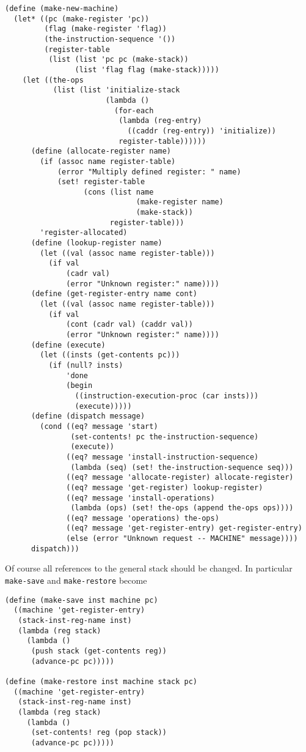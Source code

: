 \documentclass[a4paper,12pt]{article}
\begin{document}
\begin{lstlisting}
(define (make-new-machine)
  (let* ((pc (make-register 'pc))
         (flag (make-register 'flag))
         (the-instruction-sequence '())
         (register-table
          (list (list 'pc pc (make-stack))
                (list 'flag flag (make-stack)))))
    (let ((the-ops
           (list (list 'initialize-stack
                       (lambda ()
                         (for-each
                          (lambda (reg-entry)
                            ((caddr (reg-entry)) 'initialize))
                          register-table))))))
      (define (allocate-register name)
        (if (assoc name register-table)
            (error "Multiply defined register: " name)
            (set! register-table
                  (cons (list name
                              (make-register name)
                              (make-stack))
                        register-table)))
        'register-allocated)
      (define (lookup-register name)
        (let ((val (assoc name register-table)))
          (if val
              (cadr val)
              (error "Unknown register:" name))))
      (define (get-register-entry name cont)
        (let ((val (assoc name register-table)))
          (if val
              (cont (cadr val) (caddr val))
              (error "Unknown register:" name))))
      (define (execute)
        (let ((insts (get-contents pc)))
          (if (null? insts)
              'done
              (begin
                ((instruction-execution-proc (car insts)))
                (execute)))))
      (define (dispatch message)
        (cond ((eq? message 'start)
               (set-contents! pc the-instruction-sequence)
               (execute))
              ((eq? message 'install-instruction-sequence)
               (lambda (seq) (set! the-instruction-sequence seq)))
              ((eq? message 'allocate-register) allocate-register)
              ((eq? message 'get-register) lookup-register)
              ((eq? message 'install-operations)
               (lambda (ops) (set! the-ops (append the-ops ops))))
              ((eq? message 'operations) the-ops)
              ((eq? message 'get-register-entry) get-register-entry)
              (else (error "Unknown request -- MACHINE" message))))
      dispatch)))
\end{lstlisting}

Of course all references to the general stack should be changed.  In
particular \lstinline!make-save! and \lstinline!make-restore! become

\begin{lstlisting}
(define (make-save inst machine pc)
  ((machine 'get-register-entry)
   (stack-inst-reg-name inst)
   (lambda (reg stack)
     (lambda ()
      (push stack (get-contents reg))
      (advance-pc pc)))))

(define (make-restore inst machine stack pc)
  ((machine 'get-register-entry)
   (stack-inst-reg-name inst)
   (lambda (reg stack)
     (lambda ()
      (set-contents! reg (pop stack))
      (advance-pc pc)))))
\end{lstlisting}
\end{document}
